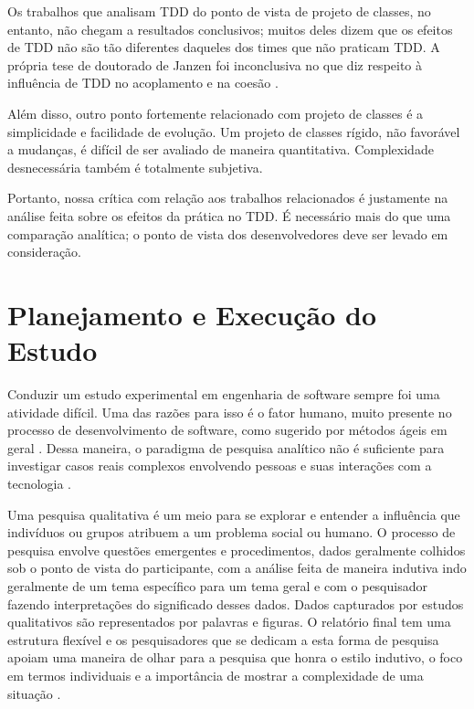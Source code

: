 \documentclass[conference]{IEEEtran}
\begin{document}
Os trabalhos que analisam TDD do ponto de vista de projeto de classes, no entanto, não
chegam a resultados conclusivos; muitos deles dizem que os efeitos
de TDD não são tão diferentes daqueles dos times que não praticam TDD.  A própria tese de
doutorado de Janzen foi inconclusiva no que diz respeito à influência de TDD no 
acoplamento e na coesão \cite{janzen-phd}. 

Além disso, outro ponto fortemente relacionado com projeto de classes é a simplicidade e
facilidade de evolução. Um projeto de classes rígido, não favorável a mudanças,  é difícil de ser 
avaliado de maneira quantitativa. Complexidade
desnecessária também é totalmente subjetiva. 

Portanto, nossa crítica
com relação aos trabalhos relacionados é justamente na análise feita sobre os
efeitos da prática no TDD. É necessário mais do que uma comparação analítica; o
ponto de vista dos desenvolvedores deve ser levado em consideração.

\section{Planejamento e Execução do Estudo} 
\label{sec:planejamento}

Conduzir um estudo experimental em engenharia de software sempre foi uma
atividade difícil. Uma das razões para isso é o fator humano, muito presente 
no processo de desenvolvimento de software, como sugerido por métodos ágeis  em
geral \cite{AgileManifesto}. Dessa maneira, o paradigma de pesquisa analítico 
não é suficiente para investigar casos reais complexos envolvendo pessoas e 
suas interações com a tecnologia \cite{guidelines-case-study}.

Uma pesquisa qualitativa é um meio para se explorar e entender a influência que 
indivíduos ou grupos atribuem a um problema social ou humano. O processo de
pesquisa envolve questões emergentes e procedimentos, dados geralmente colhidos
sob o ponto de vista do participante, com a análise feita de maneira indutiva
indo geralmente de um tema específico para um tema geral e com o pesquisador
fazendo interpretações do significado desses dados. Dados capturados por estudos
qualitativos são representados por palavras e figuras.
O relatório final tem uma estrutura flexível e os pesquisadores que se
dedicam a esta forma de pesquisa apoiam uma maneira de olhar para a pesquisa que
honra o estilo indutivo, o foco em termos individuais e a importância de mostrar a 
complexidade de uma situação \cite{creswell}.
\end{document}
